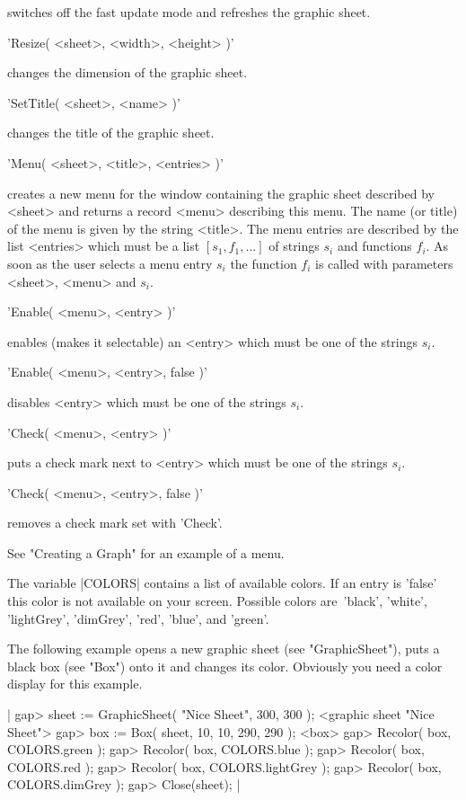 switches off the fast update mode and refreshes the graphic sheet.

'Resize( <sheet>, <width>, <height> )'

changes the dimension of the graphic sheet.

'SetTitle( <sheet>, <name> )'

changes the title of the graphic sheet.


'Menu( <sheet>, <title>, <entries> )'

creates a new menu for the window  containing the graphic sheet described
by <sheet> and returns a {\GAP} record <menu> describing  this menu.  The
name  (or title) of the  menu is given by the  string  <title>.  The menu
entries are described by the list <entries> which  must be a list $[ s_1,
f_1, ... ]$ of  strings $s_i$ and functions $f_i$.   As soon as  the user
selects a  menu entry $s_i$ the function  $f_i$ is called with parameters
<sheet>, <menu> and $s_i$.

'Enable( <menu>, <entry> )'

enables (makes it selectable) an <entry> which must be one of the strings
$s_i$.

'Enable( <menu>, <entry>, false )'

disables <entry> which must be one of the strings $s_i$.

'Check( <menu>, <entry> )'

puts a check mark next to <entry> which must be one of the strings $s_i$.

'Check( <menu>, <entry>, false )'

removes a check mark set with 'Check'.

See "Creating a Graph" for an example of a menu.


The variable |COLORS| contains a  list of available  colors.  If an entry
is  'false' this color is not  available on your screen.  Possible colors
are\:\   'black', 'white',  'lightGrey',   'dimGrey', 'red',  'blue', and
'green'.

The  following example opens   a new graphic sheet  (see "GraphicSheet"),
puts  a black box (see  "Box") onto it and  changes its color.  Obviously
you need a color display for this example.

|    gap> sheet := GraphicSheet( "Nice Sheet", 300, 300 );
    <graphic sheet "Nice Sheet">
    gap> box := Box( sheet, 10, 10, 290, 290 );
    <box>
    gap> Recolor( box, COLORS.green );
    gap> Recolor( box, COLORS.blue );
    gap> Recolor( box, COLORS.red );
    gap> Recolor( box, COLORS.lightGrey );
    gap> Recolor( box, COLORS.dimGrey );
    gap> Close(sheet); |

